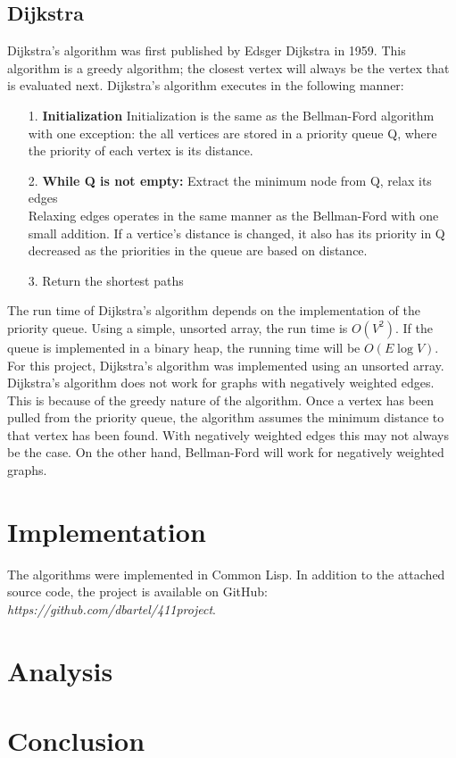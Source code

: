 \documentclass{article}
\begin{document}
    \subsection*{Dijkstra}
Dijkstra's algorithm was first published by Edsger Dijkstra in 1959. This algorithm is a greedy algorithm; the closest vertex will always be the vertex that is evaluated next. Dijkstra's algorithm executes in the following manner:
    \begin{enumerate}
      \item[1.] \textbf{Initialization} Initialization is the same as the Bellman-Ford algorithm with one exception: the all vertices are stored in a priority queue Q, where the priority of each vertex is its distance.
      \item[2.] \textbf{While Q is not empty:} Extract the minimum node from Q, relax its edges\\
        Relaxing edges operates in the same manner as the Bellman-Ford with one small addition. If a vertice's distance is changed, it also has its priority in Q decreased as the priorities in the queue are based on distance.
      \item[3.] Return the shortest paths
    \end{enumerate}
The run time of Dijkstra's algorithm depends on the implementation of the priority queue. Using a simple, unsorted array, the run time is $O(V^2)$. If the queue is implemented in a binary heap, the running time will be $O(E \log V)$.  For this project, Dijkstra's algorithm was implemented using an unsorted array.
Dijkstra's algorithm does not work for graphs with negatively weighted edges. This is because of the greedy nature of the algorithm. Once a vertex has been pulled from the priority queue, the algorithm assumes the minimum distance to that vertex has been found. With negatively weighted edges this may not always be the case. On the other hand, Bellman-Ford will work for negatively weighted graphs.
  \section*{Implementation}
The algorithms were implemented in Common Lisp. In addition to the attached source code, the project is available on GitHub: \textit{https://github.com/dbartel/411project}. 
  \section*{Analysis}
  \section*{Conclusion}
\end{document}
